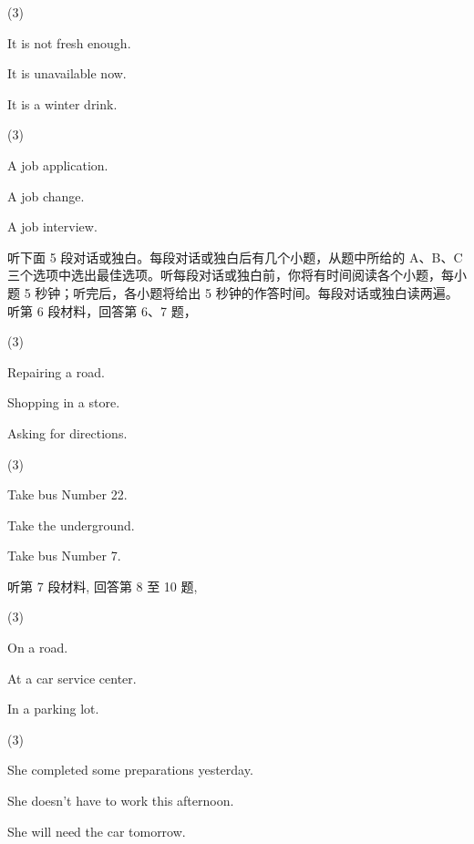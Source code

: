 \documentclass{英语试卷}
\begin{document}
\begin{choices}(3)
  \item It is not fresh enough.
  \item It is unavailable now.
  \item It is a winter drink.
\end{choices}
\begin{choices}(3)
  \item A job application.
  \item A job change.
  \item A job interview.
\end{choices}
\par 听下面 5 段对话或独白。每段对话或独白后有几个小题，从题中所给的 A、B、C 三个选项中选出最佳选项。听每段对话或独白前，你将有时间阅读各个小题，每小题 5 秒钟；听完后，各小题将给出 5 秒钟的作答时间。每段对话或独白读两遍。 听第 6 段材料，回答第 6、7 题，\par
{}
\begin{choices}(3)
  \item Repairing a road.
  \item Shopping in a store.
  \item Asking for directions.
\end{choices}
\begin{choices}(3)
  \item Take bus Number 22.
  \item Take the underground.
  \item Take bus Number 7.
\end{choices}
\par 听第 7 段材料, 回答第 8 至 10 题,\par
{}
\begin{choices}(3)
  \item On a road.
  \item At a car service center.
  \item In a parking lot.
\end{choices}
\begin{choices}(3)
  \item She completed some preparations yesterday.
  \item She doesn't have to work this afternoon.
  \item She will need the car tomorrow.
\end{choices}
\end{document}
